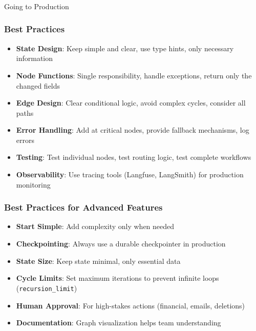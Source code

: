 \begin{frame}[fragile]\frametitle{}
\begin{center}
{\Large Going to Production}
\end{center}
\end{frame}
\begin{frame}[fragile]\frametitle{Best Practices}
      \begin{itemize}
        \item \textbf{State Design}: Keep simple and clear, use type hints, only necessary information
        \item \textbf{Node Functions}: Single responsibility, handle exceptions, return only the changed fields
        \item \textbf{Edge Design}: Clear conditional logic, avoid complex cycles, consider all paths
        \item \textbf{Error Handling}: Add at critical nodes, provide fallback mechanisms, log errors
        \item \textbf{Testing}: Test individual nodes, test routing logic, test complete workflows
        \item \textbf{Observability}: Use tracing tools (Langfuse, LangSmith) for production monitoring
      \end{itemize}
\end{frame}
\begin{frame}[fragile]\frametitle{Best Practices for Advanced Features}
      \begin{itemize}
        \item \textbf{Start Simple}: Add complexity only when needed
        \item \textbf{Checkpointing}: Always use a durable checkpointer in production
        \item \textbf{State Size}: Keep state minimal, only essential data
        \item \textbf{Cycle Limits}: Set maximum iterations to prevent infinite loops (\texttt{recursion\_limit})
        \item \textbf{Human Approval}: For high-stakes actions (financial, emails, deletions)
        \item \textbf{Documentation}: Graph visualization helps team understanding
      \end{itemize}
\end{frame}
